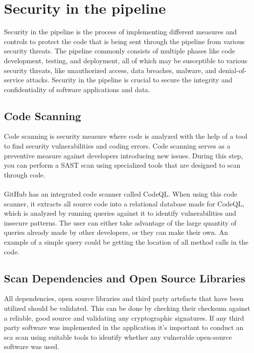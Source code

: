 \section{Security in the pipeline}
Security in the pipeline is the process of implementing different measures and controls to protect the code that is being sent through the pipeline from various security threats. The pipeline commonly consists of multiple phases like code development, testing, and deployment, all of which may be susceptible to various security threats, like unauthorized access, data breaches, malware, and denial-of-service attacks. Security in the pipeline is crucial to secure the integrity and confidentiality of software applications and data.

\subsection{Code Scanning}
Code scanning is security measure where code is analyzed with the help of a tool to find security vulnerabilities and coding errors. Code scanning serves as a preventive measure against developers introducing new issues. During this step, you can perform a SAST scan using specialized tools that are designed to scan through code. 
\\~\\
GitHub has an integrated code scanner called CodeQL. When using this code scanner, it extracts all source code into a relational database made for CodeQL, which is analyzed by running queries against it to identify vulnerabilities and insecure patterns. The user can either take advantage of the large quantity of queries already made by other developers, or they can make their own. An example of a simple query could be getting the location of all method calls in the code. 
 \cite{codeql}
\subsection{Scan Dependencies and Open Source Libraries}
All dependencies, open source libraries and third party artefacts that have been utilized should be validated. This can be done by checking their checksum against a reliable, good source and validating any cryptographic signatures. If any third party software was implemented in the application it's important to conduct an \acrshort{sca} scan using suitable tools to identify whether any vulnerable open-source software was used. \cite{bestpracticeSupplyChain}

